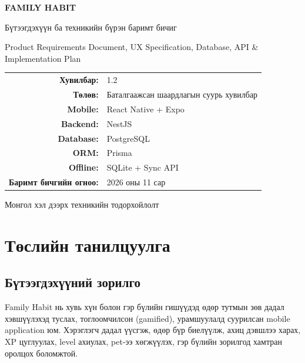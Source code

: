 \documentclass[12pt,a4paper,oneside]{report}
\newcommand{\version}{1.2}
\newcommand{\status}{Баталгаажсан шаардлагын суурь хувилбар}
\begin{document}
\begin{titlepage}
\centering
\vspace*{2.2cm}
{\Huge\bfseries\color{primary} FAMILY HABIT\par}
\vspace{0.6cm}
{\LARGE Бүтээгдэхүүн ба техникийн бүрэн баримт бичиг\par}
\vspace{0.5cm}
{\large Product Requirements Document, UX Specification, Database, API \& Implementation Plan\par}
\vfill
\begin{tabular}{rl}
\textbf{Хувилбар:} & \version\\
\textbf{Төлөв:} & \status\\
\textbf{Mobile:} & React Native + Expo\\
\textbf{Backend:} & NestJS\\
\textbf{Database:} & PostgreSQL\\
\textbf{ORM:} & Prisma\\
\textbf{Offline:} & SQLite + Sync API\\
\textbf{Баримт бичгийн огноо:} & 2026 оны 11 сар
\end{tabular}
\vfill
{\large Монгол хэл дээрх техникийн тодорхойлолт\par}
\end{titlepage}

\tableofcontents
\clearpage

\chapter{Төслийн танилцуулга}

\section{Бүтээгдэхүүний зорилго}
Family Habit нь хувь хүн болон гэр бүлийн гишүүдэд өдөр тутмын зөв дадал хэвшүүлэхэд туслах, тоглоомчилсон (gamified), урамшуулалд суурилсан mobile application юм. Хэрэглэгч дадал үүсгэж, өдөр бүр биелүүлж, ахиц дэвшлээ харах, XP цуглуулах, level ахиулах, pet-ээ хөгжүүлэх, гэр бүлийн зорилгод хамтран оролцох боломжтой.
\end{document}
